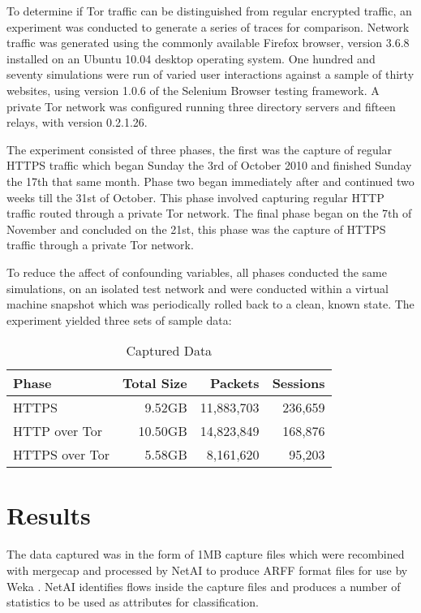 \documentclass[conference]{IEEEtran}
\begin{document}
To determine if Tor traffic can be distinguished from regular encrypted
traffic, an experiment was conducted to generate a series of traces for
comparison. Network traffic was generated using the commonly available Firefox
browser, version 3.6.8 installed on an Ubuntu 10.04 desktop operating system.
One hundred and seventy simulations were run of varied user interactions
against a sample of thirty websites, using version 1.0.6 of the Selenium
Browser testing framework. A private Tor network was configured running three
directory servers and fifteen relays, with version 0.2.1.26.

The experiment consisted of three phases, the first was the capture of regular
HTTPS traffic which began Sunday the 3rd of October 2010 and finished Sunday
the 17th that same month. Phase two began immediately after and continued two
weeks till the 31st of October. This phase involved capturing regular HTTP
traffic routed through a private Tor network. The final phase began on the 7th
of November and concluded on the 21st, this phase was the capture of HTTPS
traffic through a private Tor network. 

To reduce the affect of confounding variables, all phases conducted the same
simulations, on an isolated test network and were conducted within a virtual
machine snapshot which was periodically rolled back to a clean, known state.
The experiment yielded three sets of sample data:

\begin{table}[H]
  \begin{tabular*}{\linewidth}{lrrr}
    \toprule
    Phase & Total Size & Packets & Sessions\\
    \midrule
    HTTPS & 9.52GB & 11,883,703 & 236,659\\
    HTTP over Tor & 10.50GB & 14,823,849 & 168,876\\
    HTTPS over Tor & 5.58GB & 8,161,620 & 95,203\\
    \bottomrule
  \end{tabular*}
  \caption{Captured Data} \label{table:datasets}
\end{table}


\section{Results}

The data captured was in the form of 1MB capture files which were recombined
with mergecap and processed by NetAI \parencite{swinbut:2006fk} to produce ARFF
format files for use by Weka \parencite{Hall:2009p7662,Bouckaert:2010we}. NetAI
identifies flows inside the capture files and produces a number of statistics
to be used as attributes for classification. 
\end{document}
